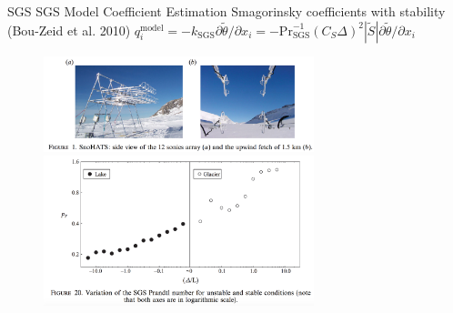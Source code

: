 \begin{frame}{SGS SGS Model Coefficient Estimation}
Smagorinsky coefficients with stability (Bou-Zeid et al. 2010)
$q_i^{\text{model}} = -k_{\text{SGS}}\partial \tilde{\theta}/\partial x_i = -\text{Pr}^{-1}_{\text{SGS}}(C_S \Delta)^2|\tilde{S}|\partial \tilde{\theta}/\partial x_i$ 
	\begin{figure}
		\includegraphics[width=0.7\textwidth]{apriori18}\\
		\includegraphics[width=0.7\textwidth]{apriori20}
	\end{figure}
\end{frame}
